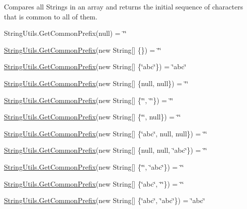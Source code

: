 Compares all Strings in an array and returns the initial sequence of characters that is common to all of them. 

String\+Utils.\+Get\+Common\+Prefix(null) = \char`\"{}\char`\"{} 

\hyperlink{class_ultimate_1_1_utilities_1_1_string_utils_a94734ea374b3fc6764df107fe7c2f48e}{String\+Utils.\+Get\+Common\+Prefix}(new String\mbox{[}\mbox{]} \{\}) = \char`\"{}\char`\"{} 

\hyperlink{class_ultimate_1_1_utilities_1_1_string_utils_a94734ea374b3fc6764df107fe7c2f48e}{String\+Utils.\+Get\+Common\+Prefix}(new String\mbox{[}\mbox{]} \{\char`\"{}abc\char`\"{}\}) = \char`\"{}abc\char`\"{} 

\hyperlink{class_ultimate_1_1_utilities_1_1_string_utils_a94734ea374b3fc6764df107fe7c2f48e}{String\+Utils.\+Get\+Common\+Prefix}(new String\mbox{[}\mbox{]} \{null, null\}) = \char`\"{}\char`\"{} 

\hyperlink{class_ultimate_1_1_utilities_1_1_string_utils_a94734ea374b3fc6764df107fe7c2f48e}{String\+Utils.\+Get\+Common\+Prefix}(new String\mbox{[}\mbox{]} \{\char`\"{}\char`\"{}, \char`\"{}\char`\"{}\}) = \char`\"{}\char`\"{} 

\hyperlink{class_ultimate_1_1_utilities_1_1_string_utils_a94734ea374b3fc6764df107fe7c2f48e}{String\+Utils.\+Get\+Common\+Prefix}(new String\mbox{[}\mbox{]} \{\char`\"{}\char`\"{}, null\}) = \char`\"{}\char`\"{} 

\hyperlink{class_ultimate_1_1_utilities_1_1_string_utils_a94734ea374b3fc6764df107fe7c2f48e}{String\+Utils.\+Get\+Common\+Prefix}(new String\mbox{[}\mbox{]} \{\char`\"{}abc\char`\"{}, null, null\}) = \char`\"{}\char`\"{} 

\hyperlink{class_ultimate_1_1_utilities_1_1_string_utils_a94734ea374b3fc6764df107fe7c2f48e}{String\+Utils.\+Get\+Common\+Prefix}(new String\mbox{[}\mbox{]} \{null, null, \char`\"{}abc\char`\"{}\}) = \char`\"{}\char`\"{} 

\hyperlink{class_ultimate_1_1_utilities_1_1_string_utils_a94734ea374b3fc6764df107fe7c2f48e}{String\+Utils.\+Get\+Common\+Prefix}(new String\mbox{[}\mbox{]} \{\char`\"{}\char`\"{}, \char`\"{}abc\char`\"{}\}) = \char`\"{}\char`\"{} 

\hyperlink{class_ultimate_1_1_utilities_1_1_string_utils_a94734ea374b3fc6764df107fe7c2f48e}{String\+Utils.\+Get\+Common\+Prefix}(new String\mbox{[}\mbox{]} \{\char`\"{}abc\char`\"{}, \char`\"{}\char`\"{}\}) = \char`\"{}\char`\"{} 

\hyperlink{class_ultimate_1_1_utilities_1_1_string_utils_a94734ea374b3fc6764df107fe7c2f48e}{String\+Utils.\+Get\+Common\+Prefix}(new String\mbox{[}\mbox{]} \{\char`\"{}abc\char`\"{}, \char`\"{}abc\char`\"{}\}) = \char`\"{}abc\char`\"{} 

